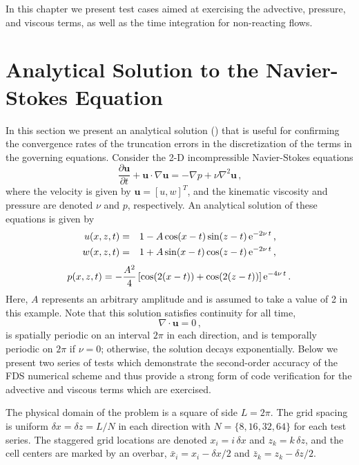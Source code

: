 \documentclass[11pt]{book}
\begin{document}
In this chapter we present test cases aimed at exercising the advective, pressure, and viscous terms, as well as the time integration for non-reacting flows.


\section{Analytical Solution to the Navier-Stokes Equation}
\label{ns2d}
\label{ns2d_64_nupt1}

In this section we present an analytical solution () that is useful for confirming the convergence rates of the truncation errors in the discretization of the terms in the governing equations. Consider the 2-D incompressible Navier-Stokes equations
\begin{equation}
\label{eqn_NS}
\frac{\partial \mathbf{u}}{\partial t} + \mathbf{u} \cdot \nabla \mathbf{u} = - \nabla{p} + \nu \nabla^2 \mathbf{u} \,\mbox{,}
\end{equation}
where the velocity is given by $\mathbf{u} = [u, w]^T$, and the kinematic viscosity and pressure are denoted $\nu$ and $p$, respectively.
An analytical solution of these equations is given by \cite{McDermott:NS2D}
\begin{eqnarray}
\label{eqn_usoln}
u(x,z,t) &=& 1 - A\cos(x-t)\sin(z-t)\,{\rm e}^{-2\nu\, t} \,\mbox{,} \\
w(x,z,t) &=& 1 + A\sin(x-t)\cos(z-t)\,{\rm e}^{-2\nu\, t} \,\mbox{,}
\end{eqnarray}
\begin{equation}
p(x,z,t) = -\frac{A^2}{4} \left[ \cos(2(x-t))+\cos(2(z-t))\right]{\rm e}^{-4\nu\, t} \,\mbox{.}
\end{equation}
Here, $A$ represents an arbitrary amplitude and is assumed to take a value of 2 in this example.
Note that this solution satisfies continuity for all time,
\begin{equation}
\label{eqn_divfree}
\nabla\cdot\mathbf{u} = 0 \,\mbox{,}
\end{equation}
is spatially periodic on an interval $2\pi$ in each direction, and is temporally periodic on $2\pi$ if $\nu=0$; otherwise, the solution decays exponentially.
Below we present two series of tests which demonstrate the second-order accuracy of the FDS numerical scheme and thus provide a strong form of code verification
for the advective and viscous terms which are exercised.

The physical domain of the problem is a square of side $L=2\pi$.  The grid spacing is uniform $\delta x = \delta z = L/N$ in each direction
with $N =\{8,16,32,64\}$ for each test series.  The staggered grid locations are denoted $x_i = i \, \delta x$ and $z_k = k \, \delta z$, and the cell
centers are marked by an overbar, $\bar{x}_i = x_i - \delta x/2$ and $\bar{z}_k = z_k - \delta z/2$.
\end{document}
